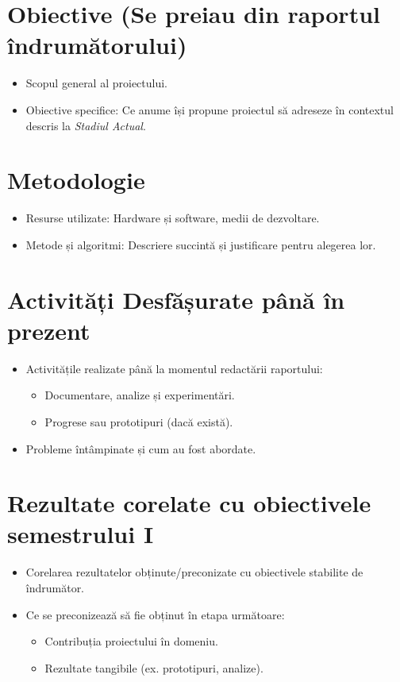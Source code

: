 \documentclass[conference, 10pt]{IEEEtran}
\begin{document}
\section{Obiective (Se preiau din raportul îndrumătorului)}
\begin{itemize}
    \item Scopul general al proiectului.
    \item Obiective specifice: Ce anume își propune proiectul să adreseze în contextul descris la \textit{Stadiul Actual}.
\end{itemize}

\section{Metodologie}
\begin{itemize}
    \item Resurse utilizate: Hardware și software, medii de dezvoltare.
    \item Metode și algoritmi: Descriere succintă și justificare pentru alegerea lor.
\end{itemize}

\section{Activități Desfășurate până în prezent}
\begin{itemize}
    \item Activitățile realizate până la momentul redactării raportului:
    \begin{itemize}
        \item Documentare, analize și experimentări.
        \item Progrese sau prototipuri (dacă există).
    \end{itemize}
    \item Probleme întâmpinate și cum au fost abordate.
\end{itemize}

\section{Rezultate corelate cu obiectivele semestrului I}
\begin{itemize}
    \item Corelarea rezultatelor obținute/preconizate cu obiectivele stabilite de îndrumător.
    \item Ce se preconizează să fie obținut în etapa următoare:
    \begin{itemize}
        \item Contribuția proiectului în domeniu.
        \item Rezultate tangibile (ex. prototipuri, analize).
    \end{itemize}
\end{itemize}
\end{document}
